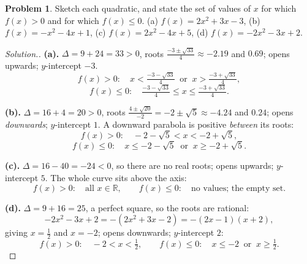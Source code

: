 \documentclass[11pt,a4paper]{article}
\theoremstyle{definition}
\newtheorem{problemx}{Problem}[section]
\newenvironment{problem}{\begin{problemx}}{\end{problemx}}
\newenvironment{solution}
  {\renewcommand{\qedsymbol}{}\begin{proof}[\textit{Solution}.]}
  {\end{proof}}
\begin{document}
\begin{problem}
Sketch each quadratic, and state the set of values of $x$ for which $f(x)>0$ and for
which $f(x)\leq 0$.
\quad (a) $f(x)=2x^2+3x-3$, \quad (b) $f(x)=-x^2-4x+1$, \quad
(c) $f(x)=2x^2-4x+5$, \quad (d) $f(x)=-2x^2-3x+2$.
\end{problem}

\begin{solution}
\textbf{(a).} $\Delta=9+24=33>0$, roots $\frac{-3\pm\sqrt{33}}{4}\approx -2.19$ and
$0.69$; opens upwards; $y$-intercept $-3$.
$$f(x)>0:\quad x<\tfrac{-3-\sqrt{33}}{4}\ \text{ or }\ x>\tfrac{-3+\sqrt{33}}{4},$$
$$f(x)\leq 0:\quad \tfrac{-3-\sqrt{33}}{4}\leq x\leq\tfrac{-3+\sqrt{33}}{4}.$$

\textbf{(b).} $\Delta=16+4=20>0$, roots $\frac{4\pm\sqrt{20}}{-2}=-2\pm\sqrt{5}\approx
-4.24$ and $0.24$; opens \emph{downwards}; $y$-intercept $1$. A downward parabola is
positive \emph{between} its roots:
$$f(x)>0:\quad -2-\sqrt{5}<x<-2+\sqrt{5},$$
$$f(x)\leq 0:\quad x\leq -2-\sqrt{5}\ \text{ or }\ x\geq -2+\sqrt{5}.$$

\textbf{(c).} $\Delta=16-40=-24<0$, so there are no real roots; opens upwards;
$y$-intercept $5$. The whole curve sits above the axis:
$$f(x)>0:\quad \text{all } x\in\mathbb{R},\qquad f(x)\leq 0:\quad \text{no values;
the empty set}.$$

\textbf{(d).} $\Delta=9+16=25$, a perfect square, so the roots are rational:
$$-2x^2-3x+2=-(2x^2+3x-2)=-(2x-1)(x+2),$$
giving $x=\frac{1}{2}$ and $x=-2$; opens downwards; $y$-intercept $2$:
$$f(x)>0:\quad -2<x<\tfrac{1}{2},\qquad
f(x)\leq 0:\quad x\leq -2\ \text{ or }\ x\geq\tfrac{1}{2}.$$


\end{solution}
\end{document}
